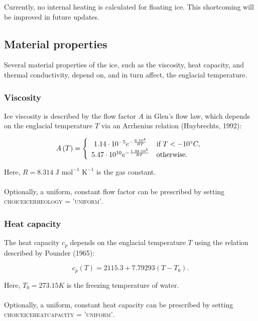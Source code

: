 \documentclass{article}
\begin{document}
Currently, no internal heating is calculated for floating ice. This shortcoming will be improved in future updates.

\subsection{Material properties}

Several material properties of the ice, such as the viscosity, heat capacity, and thermal conductivity, depend on, and in turn affect, the englacial temperature.

\subsubsection{Viscosity}

Ice viscosity is described by the flow factor $A$ in Glen's flow law, which depends on the englacial temperature $T$ via an Arrhenius relation (Huybrechts, 1992):

\begin{equation}
A \left( T \right) = \left\{
\begin{array}{ c l }
1.14 \cdot 10^{-5} e^{-\frac{6 \cdot 10^4}{RT}}& \textrm{if } T < -10 \degree C, \\
5.47 \cdot 10^{10} e^{-\frac{1.39 \cdot 10^5}{RT}} & \textrm{otherwise}.
\end{array}
\right.
\end{equation}

Here, $R = 8.314 \textrm{ J} \textrm{ mol}^{-1} \textrm{ K}^{-1}$ is the gas constant.\\
\\
Optionally, a uniform, constant flow factor can be prescribed by setting \textsc{choice\textunderscore ice\textunderscore rheology = 'uniform'}.

\subsubsection{Heat capacity}

The heat capacity $c_p$ depends on the englacial temperature $T$ using the relation described by Pounder (1965):

\begin{equation}
c_p \left( T \right) = 2115.3 + 7.79293 (T - T_0).
\end{equation}

Here, $T_0 = 273.15 K$ is the freezing temperature of water.\\
\\
Optionally, a uniform, constant heat capacity can be prescribed by setting \textsc{choice\textunderscore ice\textunderscore heat\textunderscore capacity = 'uniform'}.
\end{document}
